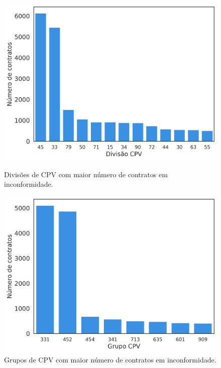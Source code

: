 \begin{figure}[H]
	\centering
	\begin{minipage}{.48\linewidth}
		\includegraphics[width=\linewidth]{imagens/r017/cpvdiv.png}
		\caption{Divisões de CPV com maior número de contratos em inconformidade.}
	\end{minipage}
	\hfill
	\begin{minipage}{.49\linewidth}
		\includegraphics[width=\linewidth]{imagens/r017/cpvgroup.png}
		\caption{Grupos de CPV com maior número de contratos em inconformidade.}
	\end{minipage}
\end{figure}




